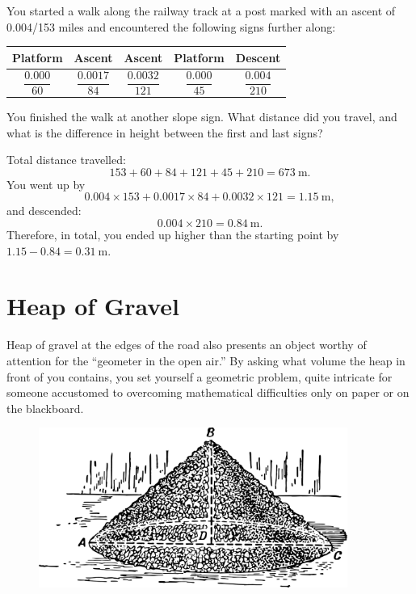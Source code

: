\ques You started a walk along the railway track at a post marked with an ascent of 0.004/153 miles and encountered the following signs further along: 
\begin{small}
\begin{center}
\begin{tabular}{ccccc}
\toprule
Platform & Ascent & Ascent & Platform & Descent\\
\midrule 
$\dfrac{0.000}{60}$ & $\dfrac{0.0017}{84}$ & $\dfrac{0.0032}{121}$ & $\dfrac{0.000}{45}$ & $\dfrac{0.004}{210}$ \\
\bottomrule
\end{tabular}
\end{center}
\end{small}
You finished the walk at another slope sign. What distance did you travel, and what is the difference in height between the first and last signs?

\ans Total distance travelled: 
\begin{equation*}%
153 + 60 + 84 + 121+ 45 + 210 = \SI{673}{\meter}.
\end{equation*}
You went up by
\begin{equation*}%
0.004 \times 153 + 0.0017 \times 84 + 0.0032 \times 121 = \SI{1.15}{\meter},
\end{equation*}
and descended:
\begin{equation*}%
0.004 \times 210 = \SI{0.84}{\meter}.
\end{equation*}
Therefore, in total, you ended up higher than the starting point by $1.15 - 0.84 = \SI{0.31}{\meter}$.

\section{Heap of Gravel}
\label{sec-4.4}

Heap of gravel at the edges of the road also presents an object worthy of attention for the ``geometer in the open air.'' By asking what volume the heap in front of you contains, you set yourself a geometric problem, quite intricate for someone accustomed to overcoming mathematical difficulties only on paper or on the blackboard. 

\begin{figure}[h!]
\centering
\includegraphics[width=0.9\textwidth]{figures/ch-04/fig-082.pdf}
\end{figure}

